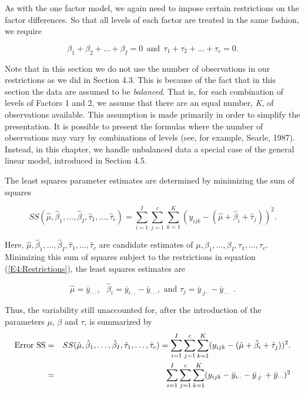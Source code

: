 As with the one factor model, we again need to impose certain
restrictions on the factor differences. So that all levels of each
factor are treated in the same fashion, we require

\begin{equation}\label{E4:Restrictions}
\beta_1 + \beta_2 + \ldots + \beta_I = 0 ~ ~\mathrm{and}~ ~\tau_1 +
\tau_2 + \ldots + \tau_c = 0.
\end{equation}

Note that in this section we do not use the number of observations
in our restrictions as we did in Section 4.3. This is because of the
fact that in this section the data are assumed to be
\textit{balanced}. That is, for each combination of levels of
Factors 1 and 2, we assume that there are an equal number,
\textit{K}, of observations available. This assumption is made
primarily in order to simplify the presentation. It is possible to
present the formulas where the number of observations may vary by
combinations of levels (see, for example, Searle, 1987). Instead, in
this chapter, we handle unbalanced data a special case of the
general linear model, introduced in Section 4.5.

The least squares parameter estimates are determined by minimizing
the sum of squares

\begin{equation*}
SS(\hat{\mu},\hat{\beta}_{1},\ldots ,\hat{\beta}_{I},
\hat{\tau}_{1},\ldots
,\hat{\tau}_{c})=\sum_{i=1}^{I}\sum_{j=1}^{c}\sum_{k=1}^{K}(y_{ijk}-(\hat{\mu}+
\hat{\beta}_{i}+\hat{\tau}_{j}))^{2}.
\end{equation*}

\noindent Here, $\hat{\mu},\hat{\beta}_{1},\ldots
,\hat{\beta}_{I},\hat{\tau}_{1},\ldots ,\hat{\tau}_{c}$ are
candidate estimates of $\mu ,\beta _{1},\ldots ,\beta _{I},\tau
_{1},\ldots ,\tau _{c}$. Minimizing this sum of squares subject to
the restrictions in equation (\ref{E4:Restrictions}), the least
squares estimates are

\begin{equation}  \label{E4:TwoFactorEstimates}
\hat{\mu}=\bar{y}_{\cdot \cdot \cdot },\text{ \ \ }\hat{\beta}_{i}=\bar{y}%
_{i\cdot \cdot }-\bar{y}_{\cdot \cdot \cdot },\text{ \ and }\hat{\tau}_{j}=%
\bar{y}_{\cdot j\cdot }-\bar{y}_{\cdot \cdot \cdot }\text{ .}
\end{equation}

Thus, the variability still unaccounted for, after the introduction
of the
parameters $\mu $, $\beta $ and $\tau $, is summarized by%
\begin{eqnarray}\label{E4:TwoFactorErrorSS}
\text{Error SS} &=&SS(\hat{\mu},\hat{\beta}_{1},\ldots ,\hat{\beta}_{I},\hat{%
\tau}_{1},\ldots ,\hat{\tau}_{c})=\sum_{i=1}^{I}\sum_{j=1}^{c}%
\sum_{k=1}^{K}(y_{ijk}-(\hat{\mu}+\hat{\beta}_{i}+\hat{\tau}_{j}))^{2}.
\notag \\
&=&\sum_{i=1}^{I}\sum_{j=1}^{c}\sum_{k=1}^{K}(y_{ijk}-\bar{y}_{i\cdot
\cdot }-\bar{y}_{\cdot j\cdot }+\bar{y}_{\cdot \cdot \cdot })^{2}
\end{eqnarray}

